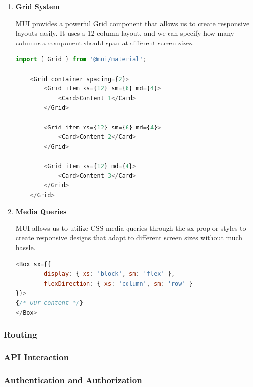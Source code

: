 	\begin{enumerate}
		\item \textbf{Grid System}
		
		MUI provides a powerful Grid component that allows us to create responsive layouts easily. It uses a 12-column layout, and we can specify how many columns a component should span at different screen sizes.


\begin{lstlisting}[language=Javascript, breaklines=true, caption=MUI Grid System]
import { Grid } from '@mui/material';

	<Grid container spacing={2}>
		<Grid item xs={12} sm={6} md={4}>
			<Card>Content 1</Card>
		</Grid>
		
		<Grid item xs={12} sm={6} md={4}>
			<Card>Content 2</Card>
		</Grid>
	
		<Grid item xs={12} md={4}>
			<Card>Content 3</Card>
		</Grid>
	</Grid>
\end{lstlisting}		

	\item \textbf{Media Queries}
	
	MUI allows us to utilize CSS media queries through the sx prop or styles to create responsive designs that adapt to different screen sizes without much hassle.

\begin{lstlisting}[language=Javascript, breaklines=true, caption=MUI Media Queries]
<Box sx={{ 
		display: { xs: 'block', sm: 'flex' }, 
		flexDirection: { xs: 'column', sm: 'row' } 
}}>
{/* Our content */}
</Box>

\end{lstlisting}	


	\end{enumerate}


\subsubsection{Routing}


\subsubsection{API Interaction}



\subsubsection{Authentication and Authorization}


